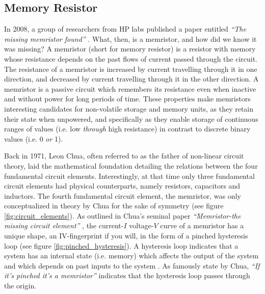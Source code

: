 \subsection{Memory Resistor}

In 2008, a group of researchers from HP labs published a paper entitled \textit{``The missing memristor found''} \cite{hp_memristor_found}. What, then, is a memristor, and how did we know it was missing? A memristor (short for memory resistor) is a resistor with memory whose resistance depends on the past flows of current passed through the circuit. The resistance of a memristor is increased by current travelling through it in one direction, and decreased by current travelling through it in the other direction. A memristor is a passive circuit which remembers its resistance even when inactive and without power for long periods of time. These properties make memristors interesting candidates for non-volatile storage and memory units, as they retain their state when unpowered, and specifically as they enable storage of continuous ranges of values (i.e. low \textit{through} high resistance) in contrast to discrete binary values (i.e. 0 \textit{or} 1).


Back in 1971, Leon Chua, often referred to as the father of non-linear circuit theory, laid the mathematical foundation detailing the relations between the four fundamental circuit elements. Interestingly, at that time only three fundamental circuit elements had physical counterparts, namely resistors, capacitors and inductors. The fourth fundamental circuit element, the memristor, was only conceptualized in theory by Chua for the sake of symmetry (see figure \ref{fig:circuit_elements}). As outlined in Chua's seminal paper \textit{``Memristor-the missing circuit element''} \cite{chua_memristor}, the current-$I$ voltage-$V$ curve of a memristor has a unique shape, an IV-fingerprint if you will, in the form of a pinched hysteresis loop (see figure \ref{fig:pinched_hysteresis}). A hysteresis loop indicates that a system has an internal state (i.e. memory) which affects the output of the system and which depends on past inputs to the system \cite{memristor_hayes}. As famously state by Chua, \textit{``If it's pinched it's a memristor''} indicates that the hysteresis loop passes through the origin.


